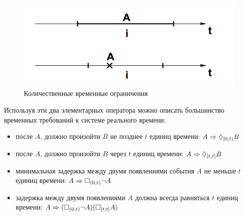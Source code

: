 		\begin{figure}[h]
			\centering
			\includegraphics[width=0.7\linewidth]{images/temporal-qualificators}
			\caption{Количественные временные ограничения}
			\label{fig:temporal-qualificators}
		\end{figure}
		
		Используя эти два элементарных оператора можно описать большинство временных требований к системе реального времени:
		\begin{itemize}
			\item после $ A $, должно произойти $ B $ не позднее $ t $ единиц времени: $ A \Rightarrow \lozenge_{[0,t)}B $
			\item после $ A $, должно произойти $ B $ через $ t $ единиц времени: $ A \Rightarrow \lozenge_{[t,t]} B $
			\item минимальная задержка между двумя появлениями события $ A $ не меньше $ t $ единиц времени: $ A \Rightarrow \square_{(0,t)} \neg A $
			\item задержка между двумя появлениями $ A $ должна всегда равняться $ t $ единиц времени: $ A \Rightarrow (\square_{(0,t)}\neg A) (\square_{[t,t]}A) $
		\end{itemize}
	
